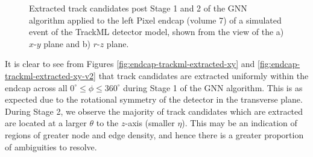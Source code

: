 \begin{figure}[htbp]%
    \centering
    \hfill
    \caption{Extracted track candidates post Stage 1 and 2 of the GNN algorithm applied to the left Pixel endcap (volume 7) of a simulated event of the TrackML detector model, shown from the view of the a) $x$-$y$ plane and b) $r$-$z$ plane.}%
    \label{fig:trackml-results-endcap-extracted-v2}%
\end{figure}

It is clear to see from Figures \ref{fig:endcap-trackml-extracted-xy} and \ref{fig:endcap-trackml-extracted-xy-v2} that track candidates are extracted uniformly within the endcap across all $ 0^{\circ} \leq \phi \leq 360^{\circ}$ during Stage 1 of the GNN algorithm. This is as expected due to the rotational symmetry of the detector in the transverse plane. During Stage 2, we observe the majority of track candidates which are extracted are located at a larger $\theta$ to the $z$-axis (smaller $\eta$). This may be an indication of regions of greater node and edge density, and hence there is a greater proportion of ambiguities to resolve.

